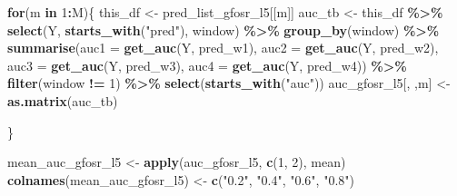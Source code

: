 \documentclass[
]{article}
\newenvironment{Shaded}{\begin{snugshade}}{\end{snugshade}}
\newcommand{\AttributeTok}[1]{\textcolor[rgb]{0.13,0.29,0.53}{#1}}
\newcommand{\ControlFlowTok}[1]{\textcolor[rgb]{0.13,0.29,0.53}{\textbf{#1}}}
\newcommand{\DecValTok}[1]{\textcolor[rgb]{0.00,0.00,0.81}{#1}}
\newcommand{\FunctionTok}[1]{\textcolor[rgb]{0.13,0.29,0.53}{\textbf{#1}}}
\newcommand{\NormalTok}[1]{#1}
\newcommand{\OtherTok}[1]{\textcolor[rgb]{0.56,0.35,0.01}{#1}}
\newcommand{\SpecialCharTok}[1]{\textcolor[rgb]{0.81,0.36,0.00}{\textbf{#1}}}
\newcommand{\StringTok}[1]{\textcolor[rgb]{0.31,0.60,0.02}{#1}}
\begin{document}
\begin{Shaded}
\begin{Highlighting}[]
\ControlFlowTok{for}\NormalTok{(m }\ControlFlowTok{in} \DecValTok{1}\SpecialCharTok{:}\NormalTok{M)\{}
\NormalTok{  this\_df }\OtherTok{\textless{}{-}}\NormalTok{ pred\_list\_gfosr\_l5[[m]]}
\NormalTok{  auc\_tb }\OtherTok{\textless{}{-}}\NormalTok{ this\_df }\SpecialCharTok{\%\textgreater{}\%} 
    \FunctionTok{select}\NormalTok{(Y, }\FunctionTok{starts\_with}\NormalTok{(}\StringTok{"pred"}\NormalTok{), window) }\SpecialCharTok{\%\textgreater{}\%}
    \FunctionTok{group\_by}\NormalTok{(window) }\SpecialCharTok{\%\textgreater{}\%}
    \FunctionTok{summarise}\NormalTok{(}\AttributeTok{auc1 =} \FunctionTok{get\_auc}\NormalTok{(Y, pred\_w1),}
              \AttributeTok{auc2 =} \FunctionTok{get\_auc}\NormalTok{(Y, pred\_w2),}
              \AttributeTok{auc3 =} \FunctionTok{get\_auc}\NormalTok{(Y, pred\_w3),}
              \AttributeTok{auc4 =} \FunctionTok{get\_auc}\NormalTok{(Y, pred\_w4)) }\SpecialCharTok{\%\textgreater{}\%}
    \FunctionTok{filter}\NormalTok{(window }\SpecialCharTok{!=} \DecValTok{1}\NormalTok{) }\SpecialCharTok{\%\textgreater{}\%} 
    \FunctionTok{select}\NormalTok{(}\FunctionTok{starts\_with}\NormalTok{(}\StringTok{"auc"}\NormalTok{))}
\NormalTok{  auc\_gfosr\_l5[, ,m] }\OtherTok{\textless{}{-}} \FunctionTok{as.matrix}\NormalTok{(auc\_tb)}

\NormalTok{\}}


\NormalTok{mean\_auc\_gfosr\_l5 }\OtherTok{\textless{}{-}} \FunctionTok{apply}\NormalTok{(auc\_gfosr\_l5, }\FunctionTok{c}\NormalTok{(}\DecValTok{1}\NormalTok{, }\DecValTok{2}\NormalTok{), mean)}
\FunctionTok{colnames}\NormalTok{(mean\_auc\_gfosr\_l5) }\OtherTok{\textless{}{-}} \FunctionTok{c}\NormalTok{(}\StringTok{"0.2"}\NormalTok{, }\StringTok{"0.4"}\NormalTok{, }\StringTok{"0.6"}\NormalTok{, }\StringTok{"0.8"}\NormalTok{)}
\end{Highlighting}
\end{Shaded}
\end{document}
